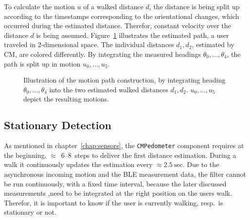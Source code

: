 To calculate the motion $u$ of a walked distance $d$, the distance is being split up according to the timestamps corresponding to the orientational changes, which occurred during the estimated distance. Therefor, constant velocity over the distance $d$ is being assumed. Figure~\ref{fig:mm_path} illustrates the estimated path, a user traveled in 2-dimensional space. The individual distances $d_1, d_2$, estimated by \acs{CM}, are colored differently. By integrating the measured headings $\theta_0, \ldots, \theta_4$, the path is split up in motion $u_0, \ldots, u_5$.


\begin{figure}
\caption{Illustration of the motion path construction, by integrating heading $\theta_0, \ldots, \theta_4$ into the two estimated walked distances $d_1, d_2$. $u_0, \ldots, u_5$ depict the resulting motions.}
\label{fig:mm_path}
\end{figure}


\subsection{Stationary Detection}\label{sec:algo_stationary}
As mentioned in chapter~\ref{chap:sensors}, the \texttt{CMPedometer} component requires at the beginning, $\approx$~6--8~steps to deliver the first distance estimation. During a walk it continuously updates the estimation every $\approx 2.5~\text{sec}$. Due to the asynchronous incoming motion and the \acs{BLE} measurement data, the filter cannot be run continuously, with a fixed time interval, because the later discussed measurements ,need to be integrated at the right position on the users walk. Therefor, it is important to know if the user is currently walking, resp.\ is stationary or not.

